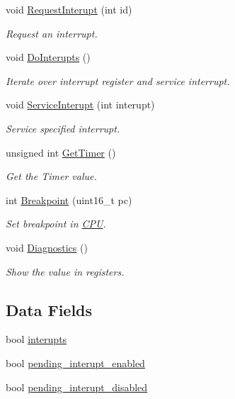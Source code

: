 \begin{DoxyCompactItemize}
void \mbox{\hyperlink{classCPU_ad65b0c4a4b9db9d040ddd22f8eb0bd08}{Request\+Interupt}} (int id)
\begin{DoxyCompactList}\small\item\em Request an interrupt. \end{DoxyCompactList}\item 
\mbox{\label{classCPU_a65a4b697968c6a46b673f32a7817d757}} 
void \mbox{\hyperlink{classCPU_a65a4b697968c6a46b673f32a7817d757}{Do\+Interupts}} ()
\begin{DoxyCompactList}\small\item\em Iterate over interrupt register and service interrupt. \end{DoxyCompactList}\item 
void \mbox{\hyperlink{classCPU_ab932fc0e9d81733f90e878d644991e2e}{Service\+Interupt}} (int interupt)
\begin{DoxyCompactList}\small\item\em Service specified interrupt. \end{DoxyCompactList}\item 
unsigned int \mbox{\hyperlink{classCPU_a61fc2fe8c3cdbb6a5628ae5a1bfe3fa2}{Get\+Timer}} ()
\begin{DoxyCompactList}\small\item\em Get the Timer value. \end{DoxyCompactList}\item 
int \mbox{\hyperlink{classCPU_af4808063d0a0951498356c5fe2acd658}{Breakpoint}} (uint16\+\_\+t pc)
\begin{DoxyCompactList}\small\item\em Set breakpoint in \mbox{\hyperlink{classCPU}{C\+PU}}. \end{DoxyCompactList}\item 
\mbox{\label{classCPU_a4a20f8c57aaec340f263170d28c4e1cd}} 
void \mbox{\hyperlink{classCPU_a4a20f8c57aaec340f263170d28c4e1cd}{Diagnostics}} ()
\begin{DoxyCompactList}\small\item\em Show the value in registers. \end{DoxyCompactList}\end{DoxyCompactItemize}
\subsection*{Data Fields}
\begin{DoxyCompactItemize}
\item 
bool \mbox{\hyperlink{classCPU_a797905d25211f84cb8b21bd1ddb0d5f2}{interupts}}
\item 
bool \mbox{\hyperlink{classCPU_a47fbbb6dd480628b4a70229b60780426}{pending\+\_\+interupt\+\_\+enabled}}
\item 
bool \mbox{\hyperlink{classCPU_ac51eaed220b85ec31587946bcbea6c48}{pending\+\_\+interupt\+\_\+disabled}}
\end{DoxyCompactItemize}
